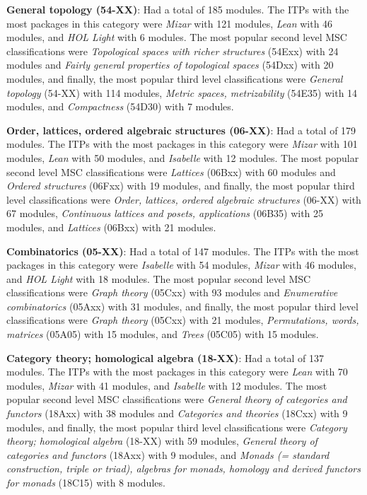 \documentclass[
]{article}
\begin{document}
\textbf{General topology (54-XX)}: Had a total of 185 modules. The ITPs
with the most packages in this category were \emph{Mizar} with 121
modules, \emph{Lean} with 46 modules, and \emph{HOL Light} with 6
modules. The most popular second level MSC classifications were
\emph{Topological spaces with richer structures} (54Exx) with 24 modules
and \emph{Fairly general properties of topological spaces} (54Dxx) with
20 modules, and finally, the most popular third level classifications
were \emph{General topology } (54-XX) with 114 modules, \emph{Metric
spaces, metrizability} (54E35) with 14 modules, and \emph{Compactness}
(54D30) with 7 modules.

\textbf{Order, lattices, ordered algebraic structures (06-XX)}: Had a
total of 179 modules. The ITPs with the most packages in this category
were \emph{Mizar} with 101 modules, \emph{Lean} with 50 modules, and
\emph{Isabelle} with 12 modules. The most popular second level MSC
classifications were \emph{Lattices } (06Bxx) with 60 modules and
\emph{Ordered structures} (06Fxx) with 19 modules, and finally, the most
popular third level classifications were \emph{Order, lattices, ordered
algebraic structures} (06-XX) with 67 modules, \emph{Continuous lattices
and posets, applications } (06B35) with 25 modules, and \emph{Lattices }
(06Bxx) with 21 modules.

\textbf{Combinatorics (05-XX)}: Had a total of 147 modules. The ITPs
with the most packages in this category were \emph{Isabelle} with 54
modules, \emph{Mizar} with 46 modules, and \emph{HOL Light} with 18
modules. The most popular second level MSC classifications were
\emph{Graph theory } (05Cxx) with 93 modules and \emph{Enumerative
combinatorics } (05Axx) with 31 modules, and finally, the most popular
third level classifications were \emph{Graph theory } (05Cxx) with 21
modules, \emph{Permutations, words, matrices} (05A05) with 15 modules,
and \emph{Trees} (05C05) with 15 modules.

\textbf{Category theory; homological algebra (18-XX)}: Had a total of
137 modules. The ITPs with the most packages in this category were
\emph{Lean} with 70 modules, \emph{Mizar} with 41 modules, and
\emph{Isabelle} with 12 modules. The most popular second level MSC
classifications were \emph{General theory of categories and functors}
(18Axx) with 38 modules and \emph{Categories and theories} (18Cxx) with
9 modules, and finally, the most popular third level classifications
were \emph{Category theory; homological algebra } (18-XX) with 59
modules, \emph{General theory of categories and functors} (18Axx) with 9
modules, and \emph{Monads (= standard construction, triple or triad),
algebras for monads, homology and derived functors for monads } (18C15)
with 8 modules.
\end{document}
